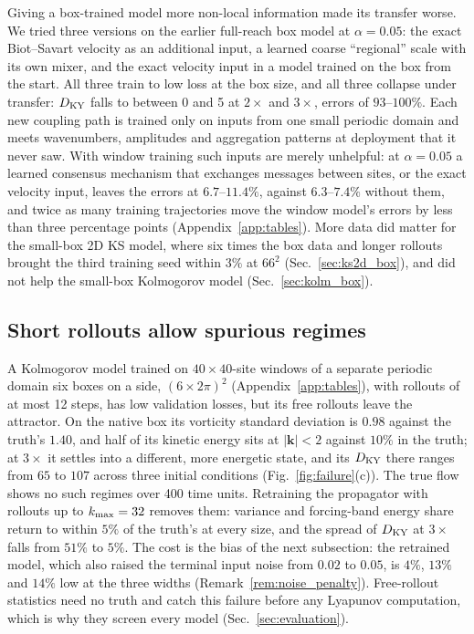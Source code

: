 Giving a box-trained model more non-local information made its transfer
worse. We tried three versions on the earlier full-reach box model at
$\alpha=0.05$: the exact Biot--Savart velocity as an additional input, a
learned coarse ``regional'' scale with its own mixer, and the exact
velocity input in a model trained on the box from the start. All three
train to low loss at the box size, and all three collapse under transfer:
$D_{\mathrm{KY}}$ falls to between 0 and 5 at $2\times$ and $3\times$, errors of
$93$--$100\%$. Each new coupling path is trained only on inputs from one
small periodic domain and meets wavenumbers, amplitudes and aggregation
patterns at deployment that it never saw. With window training such
inputs are merely unhelpful: at $\alpha=0.05$ a learned consensus mechanism
that exchanges messages between sites, or the exact velocity input,
leaves the errors at $6.7$--$11.4\%$, against $6.3$--$7.4\%$ without them, and
twice as many training trajectories move the window model's errors by less
than three percentage points (Appendix~\ref{app:tables}). More data did
matter for the small-box 2D KS model, where six times the box data and
longer rollouts brought the third training seed within $3\%$ at $66^2$
(Sec.~\ref{sec:ks2d_box}), and did not help the small-box Kolmogorov
model (Sec.~\ref{sec:kolm_box}).

\subsection{Short rollouts allow spurious regimes}
\label{sec:fail_regimes}

A Kolmogorov model trained on $40\times40$-site windows of a separate
periodic domain six boxes on a side, $(6\times2\pi)^2$ (Appendix~\ref{app:tables}),
with rollouts of at most 12 steps, has low validation losses, but its free
rollouts leave the attractor. On the native box its vorticity standard deviation is $0.98$
against the truth's $1.40$, and half of its kinetic energy sits at
$|\bm k|<2$ against $10\%$ in the truth; at $3\times$ it settles into a
different, more energetic state, and its $D_{\mathrm{KY}}$ there ranges from $65$ to
$107$ across three initial conditions (Fig.~\ref{fig:failure}(c)). The
true flow shows no such regimes over 400 time units. Retraining the
propagator with rollouts up to $k_{\max}=32$ removes them: variance and
forcing-band energy share return to within $5\%$ of the truth's at every
size, and the spread of $D_{\mathrm{KY}}$ at $3\times$ falls from $51\%$ to $5\%$. The
cost is the bias of the next subsection: the retrained model, which
also raised the terminal input noise from $0.02$ to $0.05$, is $4\%$, $13\%$
and $14\%$ low at the three widths (Remark~\ref{rem:noise_penalty}).
Free-rollout statistics need no truth and catch this failure before
any Lyapunov computation, which is why they screen every model
(Sec.~\ref{sec:evaluation}).

